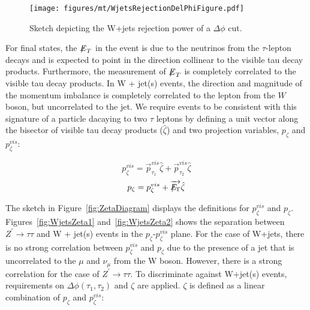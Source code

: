 \begin{figure}
\begin{center}
\texttt{[image: figures/mt/WjetsRejectionDelPhiFigure.pdf]}
\caption{ Sketch depicting the W+jets rejection power of a $\Delta \phi$ cut.}
\label{fig:WjetsRejectionDelPhiFigure}
\end{center}
\end{figure}

For \ditau final states, the ${\not\mathrel{E}}_T$ in the event is due to the neutrinos from the $\tau$-lepton decays and is expected to point in the direction collinear 
to the visible tau decay products. Furthermore, the measurement of ${\not\mathrel{E}}_T$ is completely correlated to the visible tau decay products. In W + jet(s) 
events, the direction and magnitude of the momentum imbalance is completely correlated to the lepton from the $W$ boson, but 
uncorrelated to the jet. We require events to be consistent with this signature of a particle dacaying to two $\tau$ leptons by defining a unit vector along the 
bisector of visible tau decay products ($\hat{\zeta}$) and two projection variables, $p_{\zeta}$ and $p_{\zeta}^{vis}$:

\begin{equation}
   p_{\zeta}^{vis} = \overrightarrow{p}_{\tau_{1}}^{vis}\hat{\zeta}+\overrightarrow{p}_{\tau_{2}}^{vis}\hat{\zeta}
\label{eq:zetavis}
\end{equation}
\begin{equation}
   p_{\zeta} = p_{\zeta}^{vis}+\overrightarrow{{E\!\!\!\!/_{\rm T}}}\hat{\zeta}
\label{eq:zeta}
\end{equation}

The sketch in Figure~\ref{fig:ZetaDiagram} displays the definitions for $p_{\zeta}^{vis}$ and $p_{\zeta}$. Figures~\ref{fig:WjetsZeta1} and~\ref{fig:WjetsZeta2} 
shows the separation between $Z^{\prime}\rightarrow\tau\tau$ and W + jet(s) events in the $p_{\zeta}$-$p_{\zeta}^{vis}$ plane. For the case of W+jets, there is no 
strong correlation between $p_{\zeta}^{vis}$ and $p_{\zeta}$ due to the presence of a jet that is uncorrelated to the $\mu$ and $\nu_{\mu}$ from the W boson. 
However, there is a strong correlation for the case of $Z^{\prime} \to \tau\tau$. To discriminate against W+jet(s) events, requirements on $\Delta \phi 
(\tau_{1},\tau_{2})$ and $\zeta$ are applied. $\zeta$ is defined as a linear combination of $p_{\zeta}$ and $p_{\zeta}^{vis}$:

